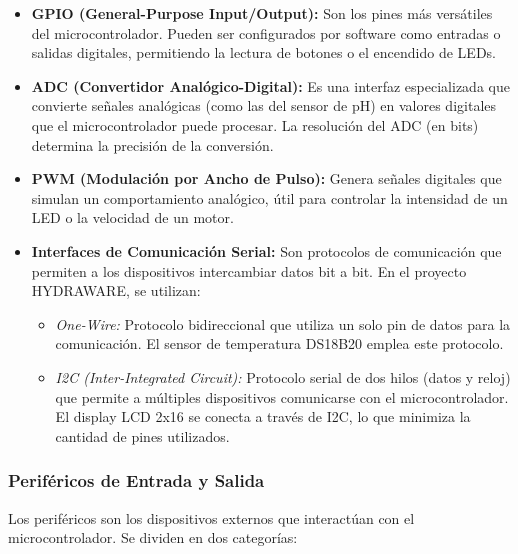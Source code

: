 \documentclass[a4paper,12pt]{article}
\begin{document}
	\begin{itemize}
		\item \textbf{GPIO (General-Purpose Input/Output):} Son los pines más versátiles del microcontrolador. Pueden ser configurados por software como entradas o salidas digitales, permitiendo la lectura de botones o el encendido de LEDs.
		\item \textbf{ADC (Convertidor Analógico-Digital):} Es una interfaz especializada que convierte señales analógicas (como las del sensor de pH) en valores digitales que el microcontrolador puede procesar. La resolución del ADC (en bits) determina la precisión de la conversión.
		\item \textbf{PWM (Modulación por Ancho de Pulso):} Genera señales digitales que simulan un comportamiento analógico, útil para controlar la intensidad de un LED o la velocidad de un motor.
		\item \textbf{Interfaces de Comunicación Serial:} Son protocolos de comunicación que permiten a los dispositivos intercambiar datos bit a bit. En el proyecto HYDRAWARE, se utilizan:
		\begin{itemize}
			\item \textit{One-Wire:} Protocolo bidireccional que utiliza un solo pin de datos para la comunicación. El sensor de temperatura DS18B20 emplea este protocolo.
			\item \textit{I2C (Inter-Integrated Circuit):} Protocolo serial de dos hilos (datos y reloj) que permite a múltiples dispositivos comunicarse con el microcontrolador. El display LCD 2x16 se conecta a través de I2C, lo que minimiza la cantidad de pines utilizados.
		\end{itemize}
	\end{itemize}
	
	\subsubsection{Periféricos de Entrada y Salida}
	Los periféricos son los dispositivos externos que interactúan con el microcontrolador. Se dividen en dos categorías:
	
\end{document}
